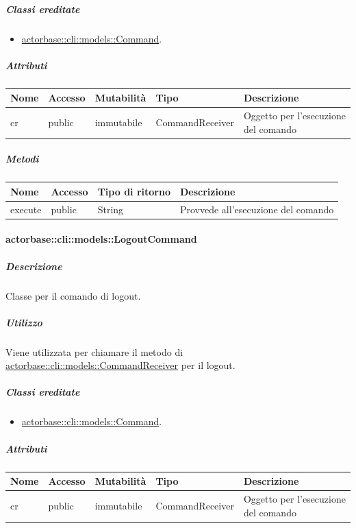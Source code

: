 \documentclass{scalatekids-article}
\begin{document}
\subparagraph{Classi ereditate}
\begin{itemize}
\item \hyperref[sec:actorbase::cli::models::Command]{actorbase::cli::models::Command}.
\end{itemize}

\subparagraph{Attributi}

\begin{tabular}{| p{1cm} | p{1.5cm} | p{2cm} | p{4cm} | p{8.5cm} |}
  \hline
  Nome & Accesso & Mutabilità & Tipo & Descrizione\\
  \hline
  cr & public & immutabile & CommandReceiver & Oggetto per l'esecuzione del comando \\
  \hline
\end{tabular}

\subparagraph{Metodi}

\begin{tabular}{| l | l | l | l |}
  \hline
  Nome & Accesso & Tipo di ritorno & Descrizione\\
  \hline
  execute & public & String & Provvede all'esecuzione del comando\\
  \hline
\end{tabular}

\paragraph{actorbase::cli::models::LogoutCommand}
\label{sec:actorbase::cli::models::LogoutCommand}

\subparagraph{Descrizione}

Classe per il comando di logout.

\subparagraph{Utilizzo}

Viene utilizzata per chiamare il metodo di
\hyperref[sec:actorbase::cli::models::CommandReceiver]{actorbase::cli::models::CommandReceiver} per il logout.

\subparagraph{Classi ereditate}

\begin{itemize}
\item \hyperref[sec:actorbase::cli::models::Command]{actorbase::cli::models::Command}.
\end{itemize}

\subparagraph{Attributi}

\begin{tabular}{| p{1cm} | p{1.5cm} | p{2cm} | p{4cm} | p{8.5cm} |}
  \hline
  Nome & Accesso & Mutabilità & Tipo & Descrizione\\
  \hline
  cr & public & immutabile & CommandReceiver & Oggetto per l'esecuzione del comando\\
  \hline
\end{tabular}
\end{document}
